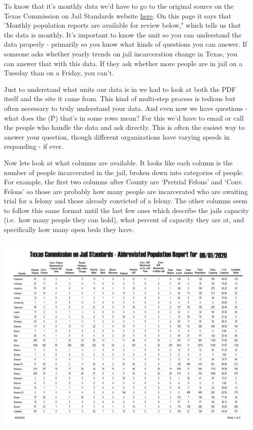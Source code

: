 \documentclass[
  12pt,
]{book}
\begin{document}
To know that it's monthly data we'd have to go to the original source on the Texas Commission on Jail Standards website \href{https://www.tcjs.state.tx.us/historical-population-reports/\#1580454195676-420daca6-0a306}{here}. On this page it says that 'Monthly population reports are available for review below," which tells us that the data is monthly. It's important to know the unit so you can understand the data properly - primarily so you know what kinds of questions you can answer. If someone asks whether yearly trends on jail incarceration change in Texas, you can answer that with this data. If they ask whether more people are in jail on a Tuesday than on a Friday, you can't.

Just to understand what units our data is in we had to look at both the PDF itself and the site it came from. This kind of multi-step process is tedious but often necessary to truly understand your data. And even now we have questions - what does the (P) that's in some rows mean? For this we'd have to email or call the people who handle the data and ask directly. This is often the easiest way to answer your question, though different organizations have varying speeds in responding - if ever.

Now lets look at what columns are available. It looks like each column is the number of people incarcerated in the jail, broken down into categories of people. For example, the first two columns after County are `Pretrial Felons' and `Conv. Felons' so those are probably how many people are incarcerated who are awaiting trial for a felony and those already convicted of a felony. The other columns seem to follow this same format until the last few ones which describe the jails capacity (i.e.~how many people they can hold), what percent of capacity they are at, and specifically how many open beds they have.

\includegraphics{images/tabulizer1.PNG}
\end{document}
